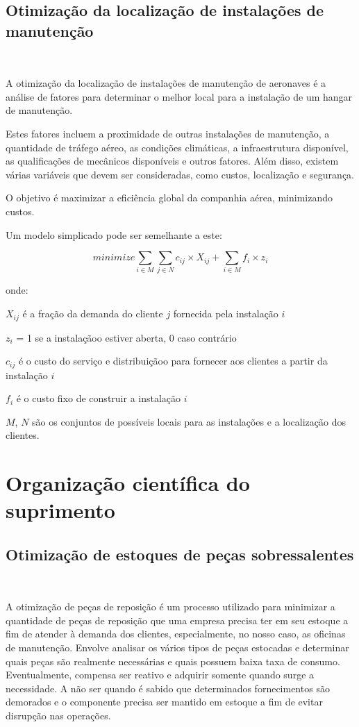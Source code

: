\documentclass{amsart}
\begin{document}
\subsection{Otimização da localização de instalações de manutenção}\

A otimização da localização de instalações de manutenção de aeronaves é a análise de fatores para determinar o melhor local para a instalação de um hangar de manutenção.

Estes fatores incluem a proximidade de outras instalações de manutenção, a quantidade de tráfego aéreo, as condições climáticas, a infraestrutura disponível, as qualificações de mecânicos disponíveis e outros fatores. Além disso, existem várias variáveis que devem ser consideradas, como custos, localização e segurança.

O objetivo é maximizar a eficiência global da companhia aérea, minimizando custos.

Um modelo simplicado pode ser semelhante a este:


\begin{equation} \label{eq:fo3}
minimize \sum_{i \in M} \sum_{j \in N} c_{ij} \times X_{ij} + \sum_{i \in M} f_i \times z_i
\end{equation}

onde:

$X_{ij}$ é a fração da demanda do cliente $j$ fornecida pela instalação $i$

$z_i$ = 1 se a instalaçãoo estiver aberta, 0 caso contrário

$c_{ij}$ é o custo do serviço e distribuiçãoo para fornecer aos clientes a partir da instalação $i$

$f_i$ é o custo fixo de construir a instalação $i$

$M$, $N$ são os conjuntos de possíveis locais para as instalações e a localização dos clientes.


\section{Organização científica do suprimento}


\subsection{Otimização de estoques de peças sobressalentes}\

A otimização de peças de reposição é um processo utilizado para minimizar a quantidade de peças de reposição que uma empresa precisa ter em seu estoque a fim de atender à demanda dos clientes, especialmente, no nosso caso, as oficinas de manutenção. Envolve analisar os vários tipos de peças estocadas e determinar quais peças são realmente necessárias e quais possuem baixa taxa de consumo. Eventualmente, compensa ser reativo e adquirir somente quando surge a necessidade. A não ser quando é sabido que determinados fornecimentos são demorados e o componente precisa ser mantido em estoque a fim de evitar disrupção nas operações.
\end{document}
